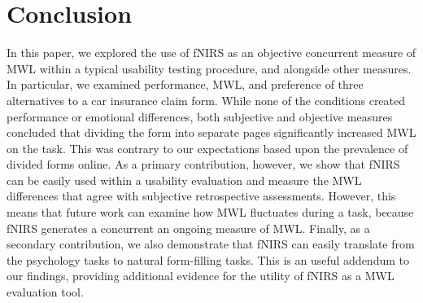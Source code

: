 \documentclass[../main/Replicate.tex]{subfiles}
\begin{document}
	\section{Conclusion}
	In this paper, we explored the use of fNIRS as an objective concurrent measure of MWL within a typical usability testing procedure, and alongside other measures. In particular, we examined performance, MWL, and preference of three alternatives to a car insurance claim form. %
	While none of the conditions created performance or emotional differences, both subjective and objective measures concluded that dividing the form into separate pages significantly increased MWL on the task. This was contrary to our expectations based upon the prevalence of divided forms online. As a primary contribution, however, we show that fNIRS can be easily used within a usability evaluation and measure the MWL differences that agree with subjective retrospective assessments. However, this means that future work can examine how MWL fluctuates during a task, because fNIRS generates a concurrent an ongoing measure of MWL. Finally, as a secondary contribution, we also demonstrate that fNIRS can easily translate from the psychology tasks to natural form-filling tasks. This is an useful addendum to our findings, providing additional evidence for the utility of fNIRS as a MWL evaluation tool.
\end{document}
